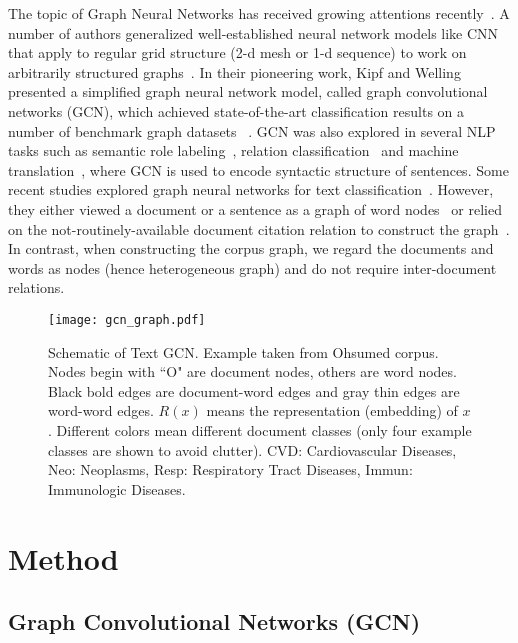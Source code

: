 \documentclass[letterpaper]{article} \usepackage{aaai19}  \usepackage{times}  \usepackage{helvet}  \usepackage{courier}  \usepackage{url}  \usepackage{graphicx}  \frenchspacing  \usepackage{amsmath}
\begin{document}
The topic of Graph Neural Networks has received growing attentions recently~\cite{cai2018comprehensive,battaglia2018relational}. A number of authors generalized well-established neural network models like CNN that apply to regular grid structure (2-d mesh or 1-d sequence) to work on arbitrarily structured graphs~\cite{bruna2013spectral,henaff2015deep,defferrard2016convolutional,kipf2017semi}.
In their pioneering work, Kipf and Welling presented a simplified graph neural network model, called graph convolutional
networks (GCN), which achieved state-of-the-art classification results on a number of benchmark graph datasets ~\cite{kipf2017semi}.
GCN was also explored in several NLP tasks such as semantic role labeling~\cite{marcheggiani2017encoding}, relation classification~\cite{li2018gcrn} and machine translation~\cite{bastings2017graph}, where GCN is used to encode syntactic structure of sentences.
Some recent studies explored graph neural networks for text classification~\cite{henaff2015deep,defferrard2016convolutional,kipf2017semi,peng2018large,DBLP:conf/acl/ZhangLS18}. 
However, they either viewed a document or a sentence as a graph of word nodes~\cite{defferrard2016convolutional,peng2018large,DBLP:conf/acl/ZhangLS18} or relied on the not-routinely-available document citation relation to construct the graph~\cite{kipf2017semi}. In contrast, when constructing the corpus graph, we regard the documents and words as nodes (hence heterogeneous graph) and do not require inter-document relations.

\begin{figure*}[t]
  \centering
  \texttt{[image: gcn\_graph.pdf]}
  \caption{Schematic of Text GCN. Example taken from Ohsumed corpus. Nodes begin with ``O" are document nodes, others are word nodes. Black bold edges are document-word edges and gray thin edges are word-word edges. $R(x)$ means the representation (embedding) of $x$. Different colors mean different document classes (only four example classes are shown to avoid clutter). CVD: Cardiovascular Diseases, Neo: Neoplasms, Resp: Respiratory Tract Diseases, Immun: Immunologic Diseases.}
  \label{fig:framework}
\end{figure*}

\section{Method}
\subsection{Graph Convolutional Networks (GCN)}
\end{document}
